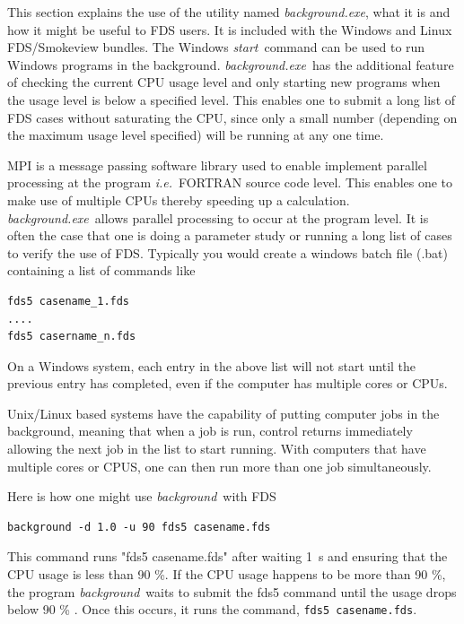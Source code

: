 \documentclass[11pt,twoside]{book}
\begin{document}
This section explains the use of the utility named {\em background.exe}, what it is and
how it might be useful to FDS users.  It is included with the Windows and Linux FDS/Smokeview
bundles.  The Windows {\em start}\ command can be used to run Windows programs in the
background.  {\em background.exe}\ has the additional feature of checking the current
CPU usage level and only starting new programs when the usage level is below a specified
level.  This enables one to submit a long list of FDS cases without saturating the CPU,
since only a small number (depending on the maximum usage level specified) will be
running at any one time.

MPI is a message passing software library used to enable implement parallel processing
at the program {\em i.e.}\ FORTRAN source code level.  This enables one to make use of
multiple CPUs thereby speeding up a calculation. {\em background.exe}\ allows parallel
processing to occur at the program level.  It is often the case that one is doing a
parameter study or running a long list of cases to verify the use of FDS. Typically you
would create a windows batch file (.bat) containing a list of commands like

\begin{verbatim}
fds5 casename_1.fds
....
fds5 casername_n.fds
\end{verbatim}

On a Windows system, each entry in the above list will not start until the previous entry
has completed, even if the computer has multiple cores or CPUs.

Unix/Linux based systems have the capability of putting computer jobs in the background,
meaning that when a job is run, control returns immediately allowing the next job in the
list to start running.  With computers that have multiple cores or CPUS, one can then run
more than one job simultaneously.

Here is how one might use {\em background}\ with FDS

\begin{verbatim}
background -d 1.0 -u 90 fds5 casename.fds
\end{verbatim}

This command runs "fds5 casename.fds" after waiting 1~s and ensuring that the CPU usage is
less than 90 \%. If the CPU usage happens to be more than 90 \%, the program {\em background}\
waits to submit the fds5 command until the usage drops below 90 \% .  Once this occurs, it runs
the command, {\tt fds5 casename.fds}.
\end{document}
